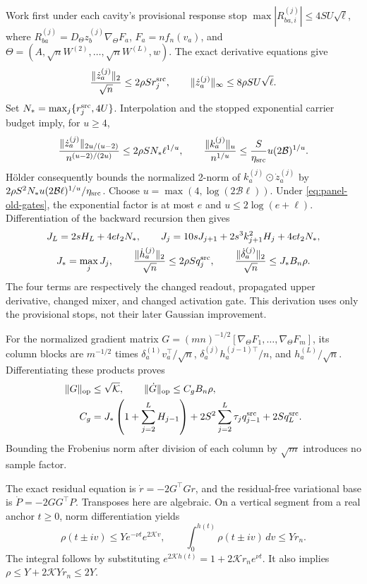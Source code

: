 Work first under each cavity's provisional response stop
\(\max|R_{ba,i}^{(j)}|\le4SU\sqrt\ell\), where
\(R_{ba}^{(j)}=D_\Theta z_b^{(j)}\nabla_\Theta F_a\),
\(F_a=nf_n(v_a)\), and
\(\Theta=(A,\sqrt nW^{(2)},\ldots,\sqrt nW^{(L)},w)\).
The exact derivative equations give
\[
 \frac{\|\dot z_a^{(j)}\|_2}{\sqrt n}\le2\rho S r_j^{\rm src},
 \qquad \|\dot z_a^{(j)}\|_\infty\le8\rho SU\sqrt\ell.
\]
Set \(N_*=\max_j\{r_j^{\rm src},4U\}\).
Interpolation and the stopped exponential carrier budget imply, for
\(u\ge4\),
\[
 \frac{\|\dot z_a^{(j)}\|_{2u/(u-2)}}{n^{(u-2)/(2u)}}
       \le2\rho SN_*\ell^{1/u},\qquad
 \frac{\|k_a^{(j)}\|_u}{n^{1/u}}
       \le\frac S{\eta_{\rm src}}u(2\mathcal B)^{1/u}.
\]
H\"older consequently bounds the normalized 2-norm of
\(k_a^{(j)}\odot\dot z_a^{(j)}\) by
\(2\rho S^2N_*u(2\mathcal B\ell)^{1/u}/\eta_{\rm src}\).
Choose \(u=\max(4,\log(2\mathcal B\ell))\).  Under
\eqref{eq:panel-old-gates}, the exponential factor is at most \(e\)
and \(u\le2\log(e+\ell)\).  Differentiation of the backward
recursion then gives
\begin{gather*}
 J_L=2sH_L+4et_2N_*,\qquad
 J_j=10sJ_{j+1}+2s^3k_{j+1}^2H_j+4et_2N_*,\\
 J_* =\max_jJ_j,\qquad
 \frac{\|\dot h_a^{(j)}\|_2}{\sqrt n}\le2\rho Sq_j^{\rm src},
 \qquad
 \frac{\|\dot\delta_a^{(j)}\|_2}{\sqrt n}\le J_*B_n\rho.
\end{gather*}
The four terms are respectively the changed readout, propagated upper
derivative, changed mixer, and changed activation gate.  This derivation
uses only the provisional stops, not their later Gaussian improvement.

For the normalized gradient matrix
\(G=(mn)^{-1/2}[\nabla_\Theta F_1,\ldots,\nabla_\Theta F_m]\),
its column blocks are \(m^{-1/2}\) times
\(\delta_a^{(1)}v_a^\top/\sqrt n\),
\(\delta_a^{(j)}h_a^{(j-1)\top}/n\), and
\(h_a^{(L)}/\sqrt n\).  Differentiating these products proves
\begin{equation}
 \begin{split}
 \|G\|_{\rm op}&\le\sqrt{\mathcal K},\qquad
 \|\dot G\|_{\rm op}\le C_gB_n\rho,\\
 C_g&=J_*\left(1+\sum_{j=2}^LH_{j-1}\right)
       +2S^2\sum_{j=2}^L\tau_jq_{j-1}^{\rm src}+2Sq_L^{\rm src}.
 \end{split}
 \label{eq:panel-gradient-derivative}
\end{equation}
Bounding the Frobenius norm after division of each column by \(\sqrt m\)
introduces no sample factor.

The exact residual equation is \(\dot r=-2G^\top Gr\), and the
residual-free variational base is \(\dot P=-2GG^\top P\).
Transposes here are algebraic.  On a vertical segment from a real
anchor \(t\ge0\), norm differentiation yields
\begin{equation}
 \rho(t\pm iv)\le Ye^{-\nu t}e^{2\mathcal K v},\qquad
 \int_0^{h(t)}\rho(t\pm iv)\,dv\le Yr_n.
 \label{eq:panel-vertical-activity}
\end{equation}
The integral follows by substituting
\(e^{2\mathcal K h(t)}=1+2\mathcal K r_ne^{\nu t}\).
It also implies \(\rho\le Y+2\mathcal K Yr_n\le2Y\).

